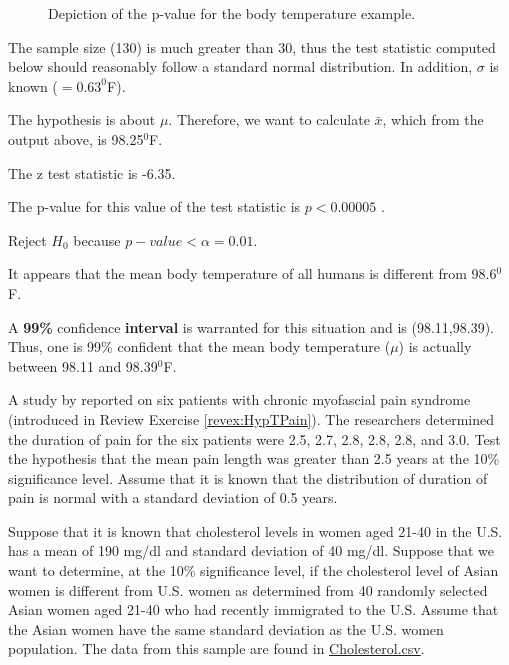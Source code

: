 \documentclass[10pt,openany]{book}\usepackage[]{graphicx}\usepackage[]{color}
\newenvironment{knitrout}{}{} %
\begin{document}
\begin{Enumerate}
\begin{knitrout}
\begin{figure}[!h]
{}

\caption[Depiction of the p-value for the body temperature example]{Depiction of the p-value for the body temperature example.}\label{fig:Ex2Zpvalue}
\end{figure}


\end{knitrout}
  \item The sample size (130) is much greater than 30, thus the test statistic computed below should reasonably follow a standard normal distribution.  In addition, $\sigma$ is known ($=0.63^{0}$F).
  \item The hypothesis is about $\mu$.  Therefore, we want to calculate $\bar{x}$, which from the output above, is 98.25$^{0}$F.
  \item The z test statistic is -6.35.
  \item The p-value for this value of the test statistic is $p<0.00005$ .
  \item Reject $H_{0}$ because $p-value<\alpha=0.01$.
  \item It appears that the mean body temperature of all humans is different from 98.6$^{0}$F.
  \item A \textbf{99\%} confidence \textbf{interval} is warranted for this situation and is (98.11,98.39).  Thus, one is 99\% confident that the mean body temperature ($\mu$) is actually between 98.11 and 98.39$^{0}$F.
\end{Enumerate}

\begin{exsection}
  \item \label{revex:HypTestZPain} \rhw{} A study by \cite{Cheshireetal1994} reported on six patients with chronic myofascial pain syndrome (introduced in Review Exercise \ref{revex:HypTPain}).  The researchers determined the duration of pain for the six patients were 2.5, 2.7, 2.8, 2.8, 2.8, and 3.0.  Test the hypothesis that the mean pain length was greater than 2.5 years at the 10\% significance level.  Assume that it is known that the distribution of duration of pain is normal with a standard deviation of 0.5 years. 

  \item \label{revex:HypTestAsianCholest} \rhw{} Suppose that it is known that cholesterol levels in women aged 21-40 in the U.S. has a mean of 190 mg/dl and standard deviation of 40 mg/dl.  Suppose that we want to determine, at the 10\% significance level, if the cholesterol level of Asian women is different from U.S. women as determined from 40 randomly selected Asian women aged 21-40 who had recently immigrated to the U.S.  Assume that the Asian women have the same standard deviation as the U.S. women population.  The data from this sample are found in \href{https://raw.githubusercontent.com/droglenc/NCData/master/Cholesterol.csv}{Cholesterol.csv}.  
\end{exsection}
\end{document}
